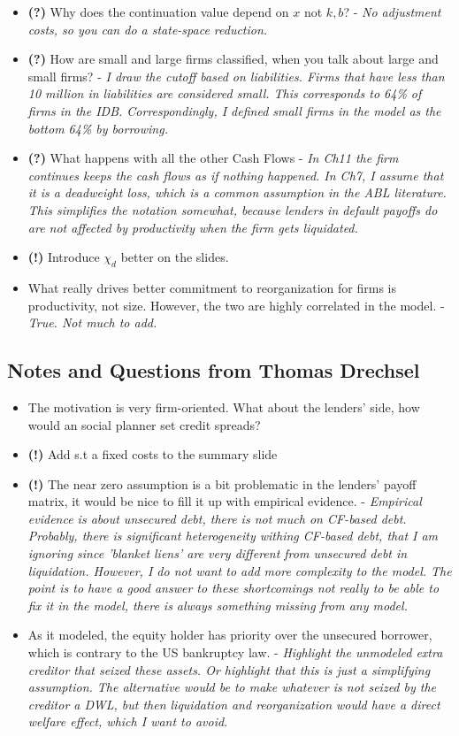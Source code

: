 \documentclass[12pt]{article}
\begin{document}
\begin{itemize}
    \item \textbf{(?)} Why does the continuation value depend on $x$ not $k,b$? - \textit{No adjustment costs, so you can do a state-space reduction. }
    \item \textbf{(?)} How are small and large firms classified, when you talk about large and small firms? - \textit{I draw the cutoff based on liabilities. Firms that have less than 10 million in liabilities are considered small. This corresponds to 64\% of firms in the IDB. Correspondingly, I defined small firms in the model as the bottom 64\% by borrowing.}
    \item \textbf{(?)} What happens with all the other Cash Flows - \textit{In Ch11 the firm continues keeps the cash flows as if nothing happened. In Ch7, I assume that it is a deadweight loss, which is a common assumption in the ABL literature. This simplifies the notation somewhat, because lenders in default payoffs do are not affected by productivity when the firm gets liquidated.}
    \item \textbf{(!)} Introduce $\chi_d$ better on the slides. 
    \item What really drives better commitment to reorganization for firms is productivity, not size. However, the two are highly correlated in the model. - \textit{True. Not much to add.}
\end{itemize}

\subsection*{Notes and Questions from Thomas Drechsel}
\begin{itemize} \setlength\itemsep{0em}  \small
    \item The motivation is very firm-oriented. What about the lenders' side, how would an social planner set credit spreads? 
    \item \textbf{(!)} Add s.t a fixed costs to the summary slide
    \item \textbf{(!)} The near zero assumption is a bit problematic in the lenders' payoff matrix, it would be nice to fill it up with empirical evidence. - \textit{Empirical evidence is about unsecured debt, there is not much on CF-based debt. Probably, there is significant heterogeneity withing CF-based debt, that I am ignoring since 'blanket liens' are very different from unsecured debt in liquidation. However, I do not want to add more complexity to the model. The point is to have a good answer to these shortcomings not really to be able to fix it in the model, there is always something missing from any model.}
    \item As it modeled, the equity holder has priority over the unsecured borrower, which is contrary to the US bankruptcy law. - \textit{Highlight the unmodeled extra creditor that seized these assets. Or highlight that this is just a simplifying assumption. The alternative would be to make whatever is not seized by the creditor a DWL, but then liquidation and reorganization would have a direct welfare effect, which I want to avoid.}
\end{itemize} \normalsize
\end{document}
